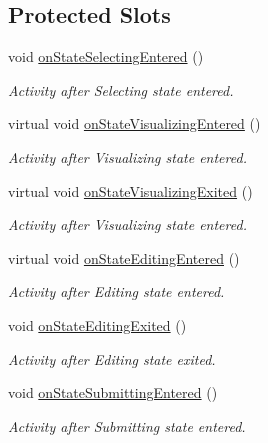 \subsection*{Protected Slots}
\begin{DoxyCompactItemize}
\item 
void \hyperlink{classmdt_abstract_sql_table_controller_a70bcc01ddd639fc05663b356df3e137e}{on\-State\-Selecting\-Entered} ()
\begin{DoxyCompactList}\small\item\em Activity after Selecting state entered. \end{DoxyCompactList}\item 
virtual void \hyperlink{classmdt_abstract_sql_table_controller_a120e99bd86672ff9d019a359b45d4e71}{on\-State\-Visualizing\-Entered} ()
\begin{DoxyCompactList}\small\item\em Activity after Visualizing state entered. \end{DoxyCompactList}\item 
virtual void \hyperlink{classmdt_abstract_sql_table_controller_a72e9097d1bed821edc46ba42fa486cb2}{on\-State\-Visualizing\-Exited} ()
\begin{DoxyCompactList}\small\item\em Activity after Visualizing state entered. \end{DoxyCompactList}\item 
virtual void \hyperlink{classmdt_abstract_sql_table_controller_a6a9611880e1fe8475d18fa628cda1bc0}{on\-State\-Editing\-Entered} ()
\begin{DoxyCompactList}\small\item\em Activity after Editing state entered. \end{DoxyCompactList}\item 
void \hyperlink{classmdt_abstract_sql_table_controller_abff869c48f9c3b3f30ace2eaef1f2691}{on\-State\-Editing\-Exited} ()
\begin{DoxyCompactList}\small\item\em Activity after Editing state exited. \end{DoxyCompactList}\item 
void \hyperlink{classmdt_abstract_sql_table_controller_a22c94c035f833168bf5dee9964f6830d}{on\-State\-Submitting\-Entered} ()
\begin{DoxyCompactList}\small\item\em Activity after Submitting state entered. \end{DoxyCompactList}\item 

\end{DoxyCompactItemize}
